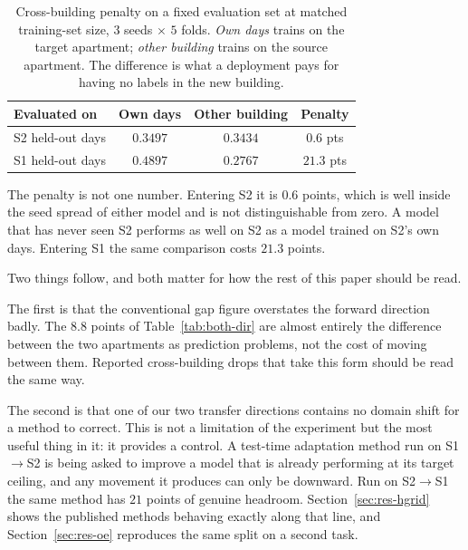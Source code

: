 \documentclass[a4paper,fleqn]{cas-dc}
\begin{document}
\begin{table}[t]
\centering
\caption{Cross-building penalty on a fixed evaluation set at matched training-set size,
$3$ seeds $\times$ $5$ folds. \emph{Own days} trains on the target apartment; \emph{other
building} trains on the source apartment. The difference is what a deployment pays for
having no labels in the new building.}
\label{tab:gap}
\small
\begin{tabular}{@{}lccc@{}}
\toprule
Evaluated on & Own days & Other building & Penalty \\
\midrule
S2 held-out days & $0.3497$ & $0.3434$ & $\mathbf{0.6}$ pts \\
S1 held-out days & $0.4897$ & $0.2767$ & $21.3$ pts \\
\bottomrule
\end{tabular}
\end{table}

The penalty is not one number. Entering S2 it is $0.6$ points, which is well inside the
seed spread of either model and is not distinguishable from zero. A model that has never
seen S2 performs as well on S2 as a model trained on S2's own days. Entering S1 the same
comparison costs $21.3$ points.

Two things follow, and both matter for how the rest of this paper should be read.

The first is that the conventional gap figure overstates the forward direction badly. The
$8.8$ points of Table~\ref{tab:both-dir} are almost entirely the difference between the
two apartments as prediction problems, not the cost of moving between them. Reported
cross-building drops that take this form should be read the same way.

The second is that one of our two transfer directions contains no domain shift for a
method to correct. This is not a limitation of the experiment but the most useful thing in
it: it provides a control. A test-time adaptation method run on S1$\to$S2 is being asked
to improve a model that is already performing at its target ceiling, and any movement it
produces can only be downward. Run on S2$\to$S1 the same method has $21$ points of genuine
headroom. Section~\ref{sec:res-hgrid} shows the published methods behaving exactly along
that line, and Section~\ref{sec:res-oe} reproduces the same split on a second task.
\end{document}

